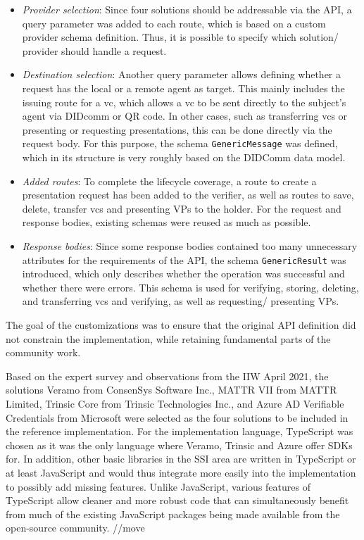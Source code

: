     \begin{itemize}
        \item \textit{Provider selection}: Since four solutions should be addressable via the API, a query parameter was added to each route, which is based on a custom provider schema definition. Thus, it is possible to specify which solution/ provider should handle a request.
        \item \textit{Destination selection}: Another query parameter allows defining whether a request has the local or a remote agent as target. This mainly includes the issuing route for a \ac{vc}, which allows a \ac{vc} to be sent directly to the subject's agent via DIDcomm or QR code. In other cases, such as transferring \acp{vc} or presenting or requesting presentations, this can be done directly via the request body. For this purpose, the schema \texttt{GenericMessage} was defined, which in its structure is very roughly based on the DIDComm data model.
        \item \textit{Added routes}: To complete the lifecycle coverage, a route to create a presentation request has been added to the verifier, as well as routes to save, delete, transfer \acp{vc} and presenting \acp{VP} to the holder. For the request and response bodies, existing schemas were reused as much as possible.
        \item \textit{Response bodies}: Since some response bodies contained too many unnecessary attributes for the requirements of the API, the schema \texttt{GenericResult} was introduced, which only describes whether the operation was successful and whether there were errors. This schema is used for verifying, storing, deleting, and transferring \acp{vc} and verifying, as well as requesting/ presenting \acp{VP}.
    \end{itemize}
    
    The goal of the customizations was to ensure that the original API definition did not constrain the implementation, while retaining fundamental parts of the community work. 
    
    Based on the expert survey and observations from the IIW April 2021, the solutions Veramo from ConsenSys Software Inc., MATTR VII from MATTR Limited, Trinsic Core from Trinsic Technologies Inc., and Azure AD Verifiable Credentials from Microsoft were selected as the four solutions to be included in the reference implementation. For the implementation language, TypeScript was chosen as it was the only language where Veramo, Trinsic and Azure offer SDKs for. In addition, other basic libraries in the \ac{SSI} area are written in TypeScript or at least JavaScript and would thus integrate more easily into the implementation to possibly add missing features. Unlike JavaScript, various features of TypeScript allow cleaner and more robust code \cite[p. 87]{zammetti_modern_2020} that can simultaneously benefit from much of the existing JavaScript packages being made available from the open-source community. //move
    
